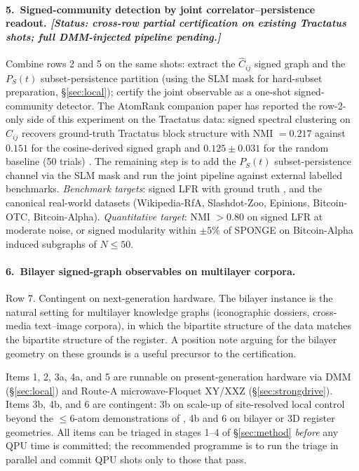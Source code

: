 \documentclass[10pt]{article}
\begin{document}
\paragraph{5.\ Signed-community detection by joint correlator--persistence readout. \emph{[Status: cross-row partial certification on existing Tractatus shots; full DMM-injected pipeline pending.]}}
Combine rows 2 and 5 on the same shots: extract the $\hat C_{ij}$ signed graph and the $P_S(t)$ subset-persistence partition (using the SLM mask for hard-subset preparation, \S\ref{sec:local}); certify the joint observable as a one-shot signed-community detector. The AtomRank companion paper has reported the row-2-only side of this experiment on the Tractatus data: signed spectral clustering on $\hat C_{ij}$ recovers ground-truth Tractatus block structure with NMI $= 0.217$ against $0.151$ for the cosine-derived signed graph and $0.125 \pm 0.031$ for the random baseline (50 trials) \cite{jurczak2026atomrank}. The remaining step is to add the $P_S(t)$ subset-persistence channel via the SLM mask and run the joint pipeline against external labelled benchmarks. \emph{Benchmark targets}: signed LFR with ground truth \citep{zhang2024signedsurvey}, and the canonical real-world datasets (Wikipedia-RfA, Slashdot-Zoo, Epinions, Bitcoin-OTC, Bitcoin-Alpha). \emph{Quantitative target}: NMI $> 0.80$ on signed LFR at moderate noise, or signed modularity within $\pm 5\%$ of \textsc{SPONGE} on Bitcoin-Alpha induced subgraphs of $N \leq 50$.

\paragraph{6.\ Bilayer signed-graph observables on multilayer corpora.}
Row 7. Contingent on next-generation hardware. The bilayer instance is the natural setting for multilayer knowledge graphs (iconographic dossiers, cross-media text--image corpora), in which the bipartite structure of the data matches the bipartite structure of the register. A position note arguing for the bilayer geometry on these grounds is a useful precursor to the certification.

Items 1, 2, 3a, 4a, and 5 are runnable on present-generation hardware via DMM (\S\ref{sec:local}) and Route-A microwave-Floquet XY/XXZ (\S\ref{sec:strongdrive}). Items 3b, 4b, and 6 are contingent: 3b on scale-up of site-resolved local control beyond the $\leq 6$-atom demonstrations of \cite{bornet2024arbitrary}, 4b and 6 on bilayer or 3D register geometries. All items can be triaged in stages 1--4 of \S\ref{sec:method} \emph{before} any QPU time is committed; the recommended programme is to run the triage in parallel and commit QPU shots only to those that pass.
\end{document}
